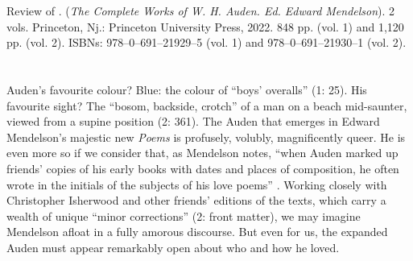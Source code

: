 


\begin{review}
\renewcommand*{\pagemark}{}


\begin{reviewed}
Review of \thecontribution. (\textit{The Complete Works of W. H. Auden. \emph{Ed. Edward Mendelson}}). 2 vols. Princeton, Nj.: Princeton University Press, 2022. 848 pp. (vol. 1) and 1,120 pp. (vol. 2). ISBNs: 978–0–691–21929–5 (vol. 1) and 978–0–691–21930–1 (vol. 2).
\end{reviewed}


\section*{} 
Auden's favourite colour? Blue: the colour of ``boys' overalls'' (1:
25). His favourite sight? The ``bosom, backside, crotch'' of a man on a
beach mid-saunter, viewed from a supine position (2: 361). The Auden
that emerges in Edward Mendelson's majestic new \emph{Poems} is
profusely, volubly, magnificently queer. He is even more so if we
consider that, as Mendelson notes, ``when Auden marked up friends'
copies of his early books with dates and places of composition, he often
wrote in the initials of the subjects of his love poems'' \parencite[43]{mendelson_early_2017}. Working closely with Christopher Isherwood and other friends'
editions of the texts, which carry a wealth of unique ``minor
corrections'' (2: front matter), we may imagine Mendelson afloat in a
fully amorous discourse. But even for us, the expanded Auden must appear
remarkably open about who and how he loved.


\end{review}
